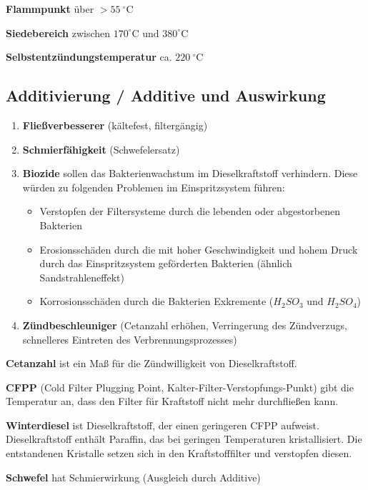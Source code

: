 \textbf{Flammpunkt} über $>55~^\circ\text{C}$

\textbf{Siedebereich} zwischen
$170^\circ\text{C} \text{ und } 380^\circ\text{C}$

\textbf{Selbstentzündungstemperatur} ca. $220~^\circ\text{C}$

\subsection{Additivierung / Additive und
Auswirkung}\label{additivierung-additive-und-auswirkung}

\begin{enumerate}
\item
  \textbf{Fließverbesserer} (kältefest, filtergängig)
\item
  \textbf{Schmierfähigkeit} (Schwefelersatz)
\item
  \textbf{Biozide} sollen das Bakterienwachstum im Dieselkraftstoff
  verhindern. Diese würden zu folgenden Problemen im Einspritzsystem
  führen:

  \begin{itemize}
  \item
    Verstopfen der Filtersysteme durch die lebenden oder abgestorbenen
    Bakterien
  \item
    Erosionsschäden durch die mit hoher Geschwindigkeit und hohem Druck
    durch das Einspritzsystem geförderten Bakterien (ähnlich
    Sandstrahleneffekt)
  \item
    Korrosionsschäden durch die Bakterien Exkremente ($H_2SO_3$ und
    $H_2SO_4$)
  \end{itemize}
\item
  \textbf{Zündbeschleuniger} (Cetanzahl erhöhen, Verringerung des
  Zündverzugs, schnelleres Eintreten des Verbrennungsprozesses)
\end{enumerate}

\textbf{Cetanzahl} ist ein Maß für die Zündwilligkeit von
Dieselkraftstoff.

\textbf{CFPP} (Cold Filter Plugging Point,
Kalter-Filter-Verstopfungs-Punkt) gibt die Temperatur an, dass den
Filter für Kraftstoff nicht mehr durchfließen kann.

\textbf{Winterdiesel} ist Dieselkraftstoff, der einen geringeren CFPP
aufweist. Dieselkraftstoff enthält Paraffin, das bei geringen
Temperaturen kristallisiert. Die entstandenen Kristalle setzen sich in
den Kraftstofffilter und verstopfen diesen.

\textbf{Schwefel} hat Schmierwirkung (Ausgleich durch Additive)

